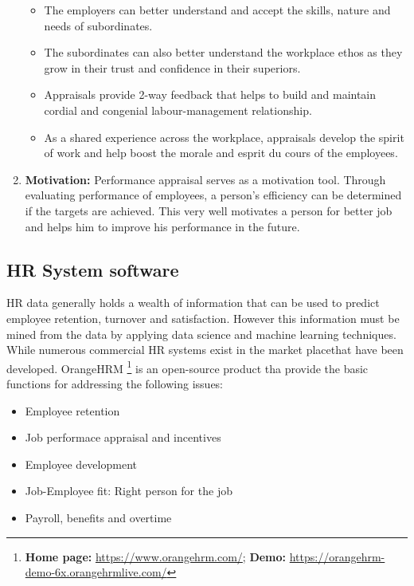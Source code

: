 \documentclass[]{book}
\providecommand{\tightlist}{%
  \setlength{\itemsep}{0pt}\setlength{\parskip}{0pt}}
\let\rmarkdownfootnote\footnote%
\def\footnote{\protect\rmarkdownfootnote}
\begin{document}
\begin{enumerate}
  \begin{itemize}
  \tightlist
  \item
    The employers can better understand and accept the skills, nature and needs of subordinates.
  \item
    The subordinates can also better understand the workplace ethos as they grow in their trust and confidence in their superiors.
  \item
    Appraisals provide 2-way feedback that helps to build and maintain cordial and congenial labour-management relationship.
  \item
    As a shared experience across the workplace, appraisals develop the spirit of work and help boost the morale and esprit du cours of the employees.
  \end{itemize}
\item
  \textbf{Motivation:} Performance appraisal serves as a motivation tool. Through evaluating performance of employees, a person's efficiency can be determined if the targets are achieved. This very well motivates a person for better job and helps him to improve his performance in the future.
\end{enumerate}

\hypertarget{hr-system-software}{%
\subsection{HR System software}\label{hr-system-software}}

HR data generally holds a wealth of information that can be used to predict employee retention, turnover and satisfaction. However this information must be mined from the data by applying data science and machine learning techniques.
While numerous commercial HR systems exist in the market placethat have been developed. OrangeHRM \footnote{\textbf{Home page:} \url{https://www.orangehrm.com/}; \textbf{Demo:} \url{https://orangehrm-demo-6x.orangehrmlive.com/}} is an open-source product tha provide the basic functions for addressing the following issues:

\begin{itemize}
\tightlist
\item
  Employee retention
\item
  Job performace appraisal and incentives
\item
  Employee development
\item
  Job-Employee fit: Right person for the job
\item
  Payroll, benefits and overtime
\end{itemize}
\end{document}
